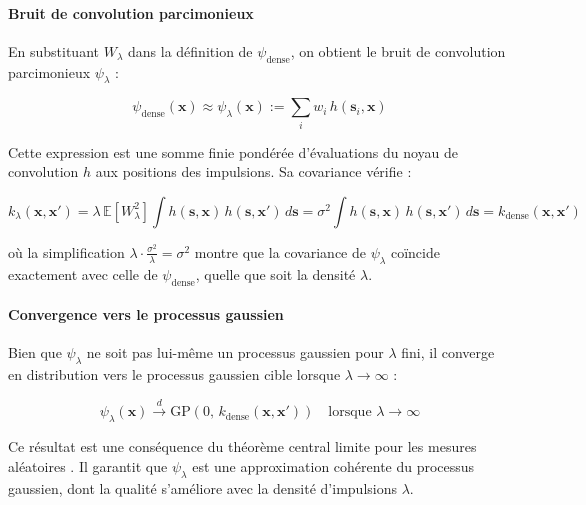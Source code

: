 \paragraph{Bruit de convolution parcimonieux}

En substituant $W_\lambda$ dans la définition de $\psi_{\text{dense}}$, on obtient le bruit de convolution parcimonieux $\psi_\lambda$ :

\begin{equation}
\psi_{\text{dense}}(\mathbf{x}) \approx \psi_\lambda(\mathbf{x}) := \sum_i w_i\, h(\mathbf{s}_i, \mathbf{x})
\end{equation}

Cette expression est une somme finie pondérée d'évaluations du noyau de convolution $h$ aux positions des impulsions. Sa covariance vérifie \cite{xu25practical} :

\begin{equation}
k_\lambda(\mathbf{x}, \mathbf{x}') = \lambda\, \mathbb{E}[W_\lambda^2]\int h(\mathbf{s}, \mathbf{x})\, h(\mathbf{s}, \mathbf{x}')\, d\mathbf{s} = \sigma^2 \int h(\mathbf{s}, \mathbf{x})\, h(\mathbf{s}, \mathbf{x}')\, d\mathbf{s} = k_{\text{dense}}(\mathbf{x}, \mathbf{x}')
\end{equation}

où la simplification $\lambda \cdot \frac{\sigma^2}{\lambda} = \sigma^2$ montre que la covariance de $\psi_\lambda$ coïncide exactement avec celle de $\psi_{\text{dense}}$, quelle que soit la densité $\lambda$.

\paragraph{Convergence vers le processus gaussien}

Bien que $\psi_\lambda$ ne soit pas lui-même un processus gaussien pour $\lambda$ fini, il converge en distribution vers le processus gaussien cible lorsque $\lambda \to \infty$ :

\begin{equation}
\psi_\lambda(\mathbf{x}) \xrightarrow{d} \text{GP}(0,\, k_{\text{dense}}(\mathbf{x}, \mathbf{x}')) \quad \text{lorsque } \lambda \to \infty
\end{equation}

Ce résultat est une conséquence du théorème central limite pour les mesures aléatoires \cite{kallenberg1997}. Il garantit que $\psi_\lambda$ est une approximation cohérente du processus gaussien, dont la qualité s'améliore avec la densité d'impulsions $\lambda$.

